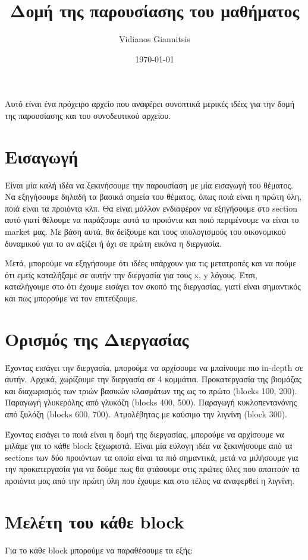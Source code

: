 \documentclass[11pt]{article}
\author{Vidianos Giannitsis}
\date{\today}
\title{Δομή της παρουσίασης του μαθήματος}
\begin{document}
\maketitle
\tableofcontents

Αυτό είναι ένα πρόχειρο αρχείο που αναφέρει συνοπτικά μερικές ιδέες για την δομή της παρουσίασης και του συνοδευτικού αρχείου.

\section{Εισαγωγή}
\label{sec:org0365259}
Είναι μία καλή ιδέα να ξεκινήσουμε την παρουσίαση με μία εισαγωγή του θέματος. Να εξηγήσουμε δηλαδή τα βασικά σημεία του θέματος, όπως ποιά είναι η πρώτη ύλη, ποιά είναι τα προιόντα κλπ. Θα είναι μάλλον ενδιαφέρον να εξηγήσουμε στο section αυτό γιατί θέλουμε να παράξουμε αυτά τα προιόντα και ποιό περιμένουμε να είναι το market μας. Με βάση αυτά, θα δείξουμε και τους υπολογισμούς του οικονομικού δυναμικού για το αν αξίζει ή όχι σε πρώτη εικόνα η διεργασία.

Μετά, μπορούμε να εξηγήσουμε ότι ιδέες υπάρχουν για τις μετατροπές και να πούμε ότι εμείς καταλήξαμε σε αυτήν την διεργασία για τους x, y λόγους. Έτσι, καταλήγουμε στο ότι έχουμε εισάγει τον σκοπό της διεργασίας, γιατί είναι σημαντικός και πως μπορούμε να τον επιτεύξουμε.

\section{Ορισμός της Διεργασίας}
\label{sec:orgd678b6c}
Έχοντας εισάγει την διεργασία, μπορούμε να αρχίσουμε να μπαίνουμε πιο in-depth σε αυτήν. Αρχικά, χωρίζουμε την διεργασία σε 4 κομμάτια. Προκατεργασία της βιομάζας και διαχωρισμός των τριών βασικών κλασμάτων της ως το πρώτο (blocks 100, 200). Παραγωγή γλυκερόλης από γλυκόζη (blocks 400, 500). Παραγωγή κυκλοπεντανόνης από ξυλόζη (blocks 600, 700). Ατμολέβητας με καύσιμο την λιγνίνη (block 300).

Έχοντας εισάγει το ποιά είναι η δομή της διεργασίας, μπορούμε να αρχίσουμε να μιλάμε για το κάθε block ξεχωριστά. Είναι μία εύλογη ιδέα να ξεκινήσουμε από τα sections των δύο προιόντων τα οποία είναι τα πιό σημαντικά, μετά να μιλήσουμε για την προκατεργασία για να δούμε πως θα φτάσουμε στις πρώτες ύλες που απαιτούν τα προιόντα μας από την πρώτη ύλη που έχουμε και στο τέλος να αναφερθεί η λιγνίνη.

\section{Μελέτη του κάθε block}
\label{sec:orgf176c74}
Για το κάθε block μπορούμε να παραθέσουμε τα εξής:
\end{document}

